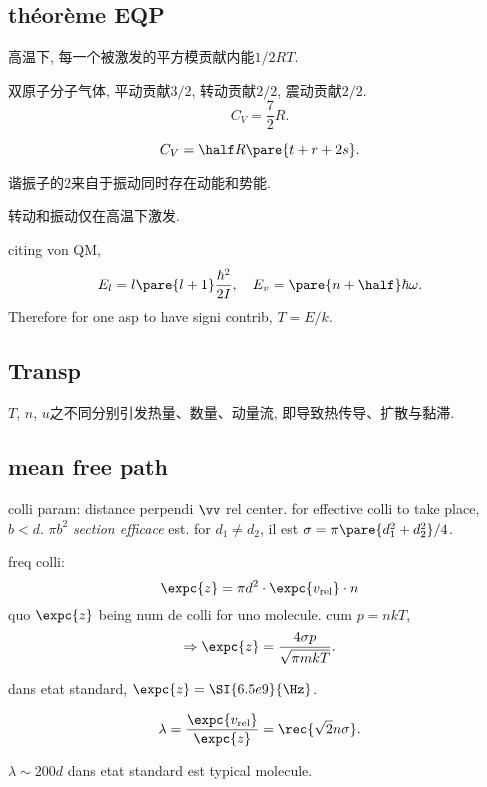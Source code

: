 \documentclass{ctexart}
\begin{document}
\subsection{\texorpdfstring{th\'eor\`eme EQP}{theorem EQP}} %
\label{sub:theoreme_EQP}

\begin{finale}
	高温下, 每一个被激发的平方模贡献内能$1/2RT$.
\end{finale}
\begin{ex}
	双原子分子气体, 平动贡献$3/2$, 转动贡献$2/2$, 震动贡献$2/2$.
	\[ C_V = \frac{7}{2}R. \]
\end{ex}
\begin{finale}
	\[ C_V = \half R\pare{t+r+2s}. \]
\end{finale}
\begin{pitfall}
	谐振子的$2$来自于振动同时存在动能和势能.
\end{pitfall}
\begin{pitfall}
	转动和振动仅在高温下激发.
\end{pitfall}
citing von QM,
\[ E_l = l\pare{l+1}\frac{\hbar^2}{2I},\quad E_v = \pare{n+\half}\hbar\omega. \]
Therefore for one asp to have signi contrib, $T = E/k$. 


\subsection{Transp} %
\label{sub:transp}

$T$, $n$, $u$之不同分别引发热量、数量、动量流, 即导致热传导、扩散与黏滞.

\subsection{mean free path} %
\label{sub:mean_free_path}

colli param: distance perpendi $\vv$ rel center. for effective colli to take place, $b < d$. $\pi b^2$ \emph{section efficace} est. for $d_1 \neq d_2$, il est $\sigma = \pi\pare{d_1^2+d_2^2}/4$.
\par
freq colli:
\[ \expc{z} = \pi d^2\cdot\expc{v_{\mathrm{rel}}}\cdot n \]
quo $\expc{z}$ being  num de colli for uno molecule. cum $p=nkT$,
\[ \Rightarrow \expc{z} = \frac{4\sigma p}{\sqrt{\pi mkT}}. \]
\begin{ex}
	dans etat standard, $\expc{z} = \SI{6.5e9}{\Hz}$.
\end{ex}
\[ \lambda = \frac{\expc{v_{\mathrm{rel}}}}{\expc{z}} = \rec{\sqrt{2}n\sigma}. \]
\begin{ex}
	$\lambda \sim 200d$ dans etat standard est typical molecule.
\end{ex}
\end{document}
